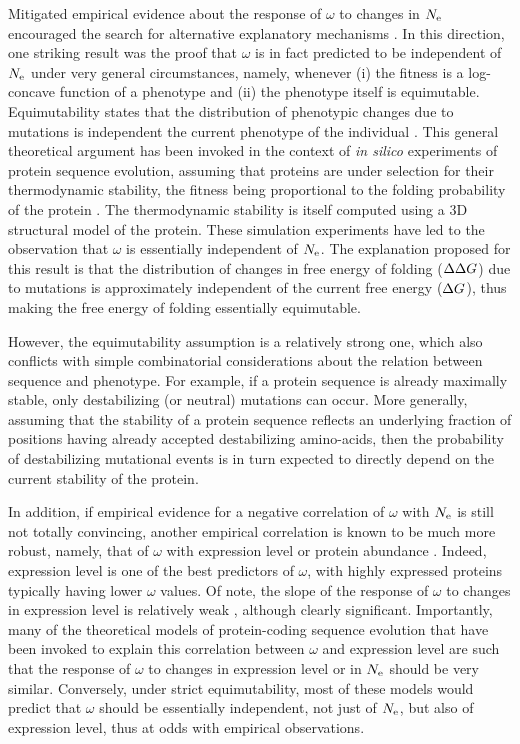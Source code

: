 \documentclass{article}
\begin{document}
	Mitigated empirical evidence about the response of $\omega$ to changes in $N_{\mathrm{e}}$ encouraged the search for alternative explanatory mechanisms \cite{Lanfear2014}.
	In this direction, one striking result was the proof that $\omega$ is in fact predicted to be independent of $N_{\mathrm{e}}$ under very general circumstances, namely, whenever (i) the fitness is a log-concave function of a phenotype and (ii) the phenotype itself is equimutable.
	Equimutability states that the distribution of phenotypic changes due to mutations is independent the current phenotype of the individual \cite{Cherry1998}.
	This general theoretical argument has been invoked in the context of \textit{in silico} experiments of protein sequence evolution, assuming that proteins are under selection for their thermodynamic stability, the fitness being proportional to the folding probability of the protein \cite{Goldstein2013}.
	The thermodynamic stability is itself computed using a 3D structural model of the protein. These simulation experiments have led to the observation that $\omega$ is essentially independent of $N_{\mathrm{e}}$.
	The explanation proposed for this result is that the distribution of changes in free energy of folding ($\Delta \Delta G$) due to mutations is approximately independent of the current free energy ($\Delta G$), thus making the free energy of folding essentially equimutable.
	
	However, the equimutability assumption is a relatively strong one, which also conflicts with simple combinatorial considerations about the relation between sequence and phenotype. For example, if a protein sequence is already maximally stable, only destabilizing (or neutral) mutations can occur. More generally, assuming that the stability of a protein sequence reflects an underlying fraction of positions having already accepted destabilizing amino-acids, then the probability of destabilizing mutational events is in turn expected to directly depend on the current stability of the protein.
	
	In addition, if empirical evidence for a negative correlation of $\omega$ with $N_{\mathrm{e}}$ is still not totally convincing, another empirical correlation is known to be much more robust, namely, that of $\omega$ with expression level or protein abundance \cite{Duret2000, Rocha2004, Wang2011, Song2017}. Indeed, expression level is one of the best predictors of $\omega$, with highly expressed proteins typically having lower $\omega$ values. Of note, the slope of the response of $\omega$ to changes in expression level is relatively weak \cite{Drummond2005}, although clearly significant. Importantly, many of the theoretical models of protein-coding sequence evolution that have been invoked to explain this correlation between $\omega$ and expression level are such that the response of $\omega$ to changes in expression level or in $N_{\mathrm{e}}$ should be very similar. Conversely, under strict equimutability, most of these models would predict that $\omega$ should be essentially independent, not just of $N_{\mathrm{e}}$, but also of expression level, thus at odds with empirical observations.
	
\end{document}
